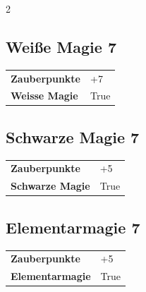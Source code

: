 \begin{multicols}{2}
\begin{tcolorbox}
    \subsection*{Weiße Magie \hfill \small{7 }}
    \tcblower




\begin{tabular}{@{}ll@{}}
    \textbf{Zauberpunkte} & +7\\
    \textbf{Weisse Magie} & True\\
\end{tabular}


\end{tcolorbox}

\begin{tcolorbox}
    \subsection*{Schwarze Magie \hfill \small{7 }}
    \tcblower




\begin{tabular}{@{}ll@{}}
    \textbf{Zauberpunkte} & +5\\
    \textbf{Schwarze Magie} & True\\
\end{tabular}


\end{tcolorbox}

\begin{tcolorbox}
    \subsection*{Elementarmagie \hfill \small{7 }}
    \tcblower




\begin{tabular}{@{}ll@{}}
    \textbf{Zauberpunkte} & +5\\
    \textbf{Elementarmagie} & True\\
\end{tabular}


\end{tcolorbox}
\end{multicols}
